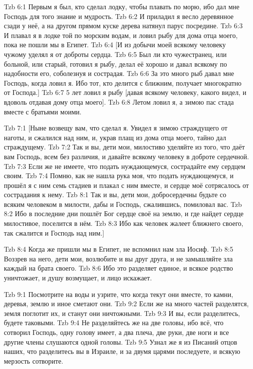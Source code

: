 \vs Tzb 6:1
Первым я был, кто сделал лодку, чтобы плавать по морю,
ибо дал мне Господь для того знание и мудрость.
\vs Tzb 6:2
И приладил я весло деревянное сзади у неё,
а на другом прямом куске дерева натянул парус посредине.
\vs Tzb 6:3
И плавал я в лодке той по морским водам,
и ловил рыбу для дома отца моего,
пока не пошли мы в Египет.
\vs Tzb 6:4
[И из добычи моей всякому человеку чужому уделял я от доброты сердца.
\vs Tzb 6:5
Был ли кто чужестранец, или больной, или старый, готовил я рыбу,
делал её хорошо и давал всякому по надобности его,
соболезнуя и сострадая.
\vs Tzb 6:6
За это много рыб давал мне Господь, когда ловил я.
Ибо тот, кто делится с ближним,
получает многократно от Господа.]
\vs Tzb 6:7
5 лет ловил я рыбу [давая всякому человеку,
какого видел, и вдоволь отдавая дому отца моего].
\vs Tzb 6:8
Летом ловил я, а зимою пас стада вместе с братьями моими.

\vs Tzb 7:1
[Ныне возвещу вам, что сделал я.
Увидел я зимою страждущего от наготы,
и сжалился над ним, и, украв плащ из дома отца моего,
тайно дал страждущему.
\vs Tzb 7:2
Так и вы, дети мои, милостиво уделяйте из того, что даёт вам Господь,
всем без различия, и давайте всякому человеку в доброте сердечной.
\vs Tzb 7:3
Если же не имеете, что подать нуждающемуся,
сострадайте ему сердцем своим.
\vs Tzb 7:4
Помню, как не нашла рука моя, что подать нуждающемуся,
и прошёл я с ним семь стадиев и плакал с ним вместе,
и сердце моё сотрясалось от сострадания к нему.
\vs Tzb 8:1
Так и вы, дети мои, добросердечны будьте со всяким человеком в милости,
дабы и Господь, сжалившись, помиловал вас.
\vs Tzb 8:2
Ибо в последние дни пошлёт Бог сердце своё на землю,
и где найдет сердце милостивое, поселится в нём.
\vs Tzb 8:3
Ибо как человек жалеет ближнего своего, так сжалится и Господь над ним.]

\vs Tzb 8:4
Когда же пришли мы в Египет, не вспомнил нам зла Иосиф.
\vs Tzb 8:5
Воззрев на него, дети мои, возлюбите и вы друг друга, и не замышляйте
зла каждый на брата своего.
\vs Tzb 8:6
Ибо это разделяет единое, и всякое родство уничтожает,
и душу возмущает, и лицо искажает.

\vs Tzb 9:1
Посмотрите на воды и узрите, что когда текут они вместе,
то камни, деревья, землю и иное сметают они.
\vs Tzb 9:2
Если же на много частей разделятся, земля поглотит их,
и станут они ничтожными.
\vs Tzb 9:3
И вы, если разделитесь, будете таковыми.
\vs Tzb 9:4
Не разделяйтесь же на две головы, ибо всё, что сотворил Господь,
одну голову имеет, а два плеча, две руки, две ноги
и все другие члены слушаются одной головы.
\vs Tzb 9:5
Узнал же я из Писаний отцов наших,
что разделитесь вы в Израиле,
и за двумя царями последуете, и всякую мерзость сотворите.


